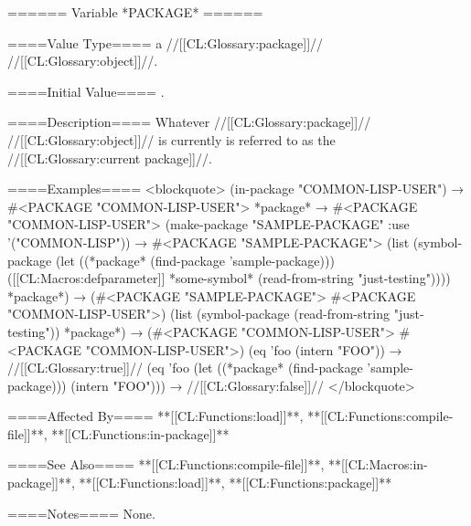 ====== Variable *PACKAGE* ======

====Value Type====
a //[[CL:Glossary:package]]// //[[CL:Glossary:object]]//.

====Initial Value====
.

====Description====
Whatever //[[CL:Glossary:package]]// //[[CL:Glossary:object]]// is currently  is referred to as the //[[CL:Glossary:current package]]//.

====Examples====
<blockquote> (in-package "COMMON-LISP-USER") → #<PACKAGE "COMMON-LISP-USER"> *package* → #<PACKAGE "COMMON-LISP-USER"> (make-package "SAMPLE-PACKAGE" :use '("COMMON-LISP")) → #<PACKAGE "SAMPLE-PACKAGE"> (list (symbol-package (let ((*package* (find-package 'sample-package))) ([[CL:Macros:defparameter]] *some-symbol* (read-from-string "just-testing")))) *package*) → (#<PACKAGE "SAMPLE-PACKAGE"> #<PACKAGE "COMMON-LISP-USER">) (list (symbol-package (read-from-string "just-testing")) *package*) → (#<PACKAGE "COMMON-LISP-USER"> #<PACKAGE "COMMON-LISP-USER">) (eq 'foo (intern "FOO")) → //[[CL:Glossary:true]]// (eq 'foo (let ((*package* (find-package 'sample-package))) (intern "FOO"))) → //[[CL:Glossary:false]]// </blockquote>

====Affected By====
**[[CL:Functions:load]]**, **[[CL:Functions:compile-file]]**, **[[CL:Functions:in-package]]**

====See Also====
**[[CL:Functions:compile-file]]**, **[[CL:Macros:in-package]]**, **[[CL:Functions:load]]**, **[[CL:Functions:package]]**

====Notes====
None.

